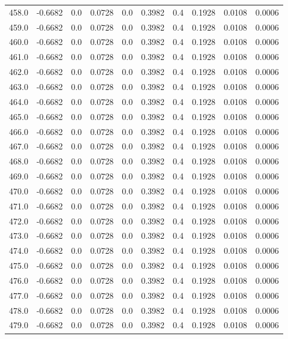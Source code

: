 \begin{longtable}{lrrrrrrrrr}
458.0 & -0.6682 & 0.0 & 0.0728 & 0.0 & 0.3982 & 0.4 & 0.1928 & 0.0108 & 0.0006 \\
459.0 & -0.6682 & 0.0 & 0.0728 & 0.0 & 0.3982 & 0.4 & 0.1928 & 0.0108 & 0.0006 \\
460.0 & -0.6682 & 0.0 & 0.0728 & 0.0 & 0.3982 & 0.4 & 0.1928 & 0.0108 & 0.0006 \\
461.0 & -0.6682 & 0.0 & 0.0728 & 0.0 & 0.3982 & 0.4 & 0.1928 & 0.0108 & 0.0006 \\
462.0 & -0.6682 & 0.0 & 0.0728 & 0.0 & 0.3982 & 0.4 & 0.1928 & 0.0108 & 0.0006 \\
463.0 & -0.6682 & 0.0 & 0.0728 & 0.0 & 0.3982 & 0.4 & 0.1928 & 0.0108 & 0.0006 \\
464.0 & -0.6682 & 0.0 & 0.0728 & 0.0 & 0.3982 & 0.4 & 0.1928 & 0.0108 & 0.0006 \\
465.0 & -0.6682 & 0.0 & 0.0728 & 0.0 & 0.3982 & 0.4 & 0.1928 & 0.0108 & 0.0006 \\
466.0 & -0.6682 & 0.0 & 0.0728 & 0.0 & 0.3982 & 0.4 & 0.1928 & 0.0108 & 0.0006 \\
467.0 & -0.6682 & 0.0 & 0.0728 & 0.0 & 0.3982 & 0.4 & 0.1928 & 0.0108 & 0.0006 \\
468.0 & -0.6682 & 0.0 & 0.0728 & 0.0 & 0.3982 & 0.4 & 0.1928 & 0.0108 & 0.0006 \\
469.0 & -0.6682 & 0.0 & 0.0728 & 0.0 & 0.3982 & 0.4 & 0.1928 & 0.0108 & 0.0006 \\
470.0 & -0.6682 & 0.0 & 0.0728 & 0.0 & 0.3982 & 0.4 & 0.1928 & 0.0108 & 0.0006 \\
471.0 & -0.6682 & 0.0 & 0.0728 & 0.0 & 0.3982 & 0.4 & 0.1928 & 0.0108 & 0.0006 \\
472.0 & -0.6682 & 0.0 & 0.0728 & 0.0 & 0.3982 & 0.4 & 0.1928 & 0.0108 & 0.0006 \\
473.0 & -0.6682 & 0.0 & 0.0728 & 0.0 & 0.3982 & 0.4 & 0.1928 & 0.0108 & 0.0006 \\
474.0 & -0.6682 & 0.0 & 0.0728 & 0.0 & 0.3982 & 0.4 & 0.1928 & 0.0108 & 0.0006 \\
475.0 & -0.6682 & 0.0 & 0.0728 & 0.0 & 0.3982 & 0.4 & 0.1928 & 0.0108 & 0.0006 \\
476.0 & -0.6682 & 0.0 & 0.0728 & 0.0 & 0.3982 & 0.4 & 0.1928 & 0.0108 & 0.0006 \\
477.0 & -0.6682 & 0.0 & 0.0728 & 0.0 & 0.3982 & 0.4 & 0.1928 & 0.0108 & 0.0006 \\
478.0 & -0.6682 & 0.0 & 0.0728 & 0.0 & 0.3982 & 0.4 & 0.1928 & 0.0108 & 0.0006 \\
479.0 & -0.6682 & 0.0 & 0.0728 & 0.0 & 0.3982 & 0.4 & 0.1928 & 0.0108 & 0.0006 \\

\end{longtable}
